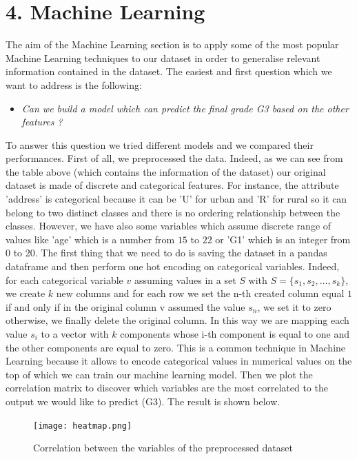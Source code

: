 \documentclass[a4paper, 11pt]{report}
\theoremstyle{definition}
\numberwithin{equation}{section}		%
\numberwithin{figure}{section}			%
\numberwithin{table}{section}				%
\begin{document}
\section*{4. Machine Learning}
The aim of the Machine Learning section is to apply some of the most popular Machine Learning techniques to our dataset in order to generalise relevant information contained in the dataset.
The easiest and first question which we want to address is the following:
\begin{itemize}
\item \textit{Can we build a model which can predict the final grade G3 based on the other features ?}
\end{itemize}
To answer this question we tried different models and we compared their performances. First of all, we preprocessed the data. Indeed, as we can see from the table above (which contains the information of the dataset) our original dataset is made of discrete and categorical features. For instance, the attribute 'address' is categorical because it can be 'U' for urban and 'R' for rural so it can belong to two distinct classes and there is no ordering relationship between the classes. However, we have also some variables which assume discrete range of values like 'age' which is a number from $15$ to $22$ or 'G1' which is an integer from $0$ to $20$. The first thing that we need to do is saving the dataset in a pandas dataframe and then perform one hot encoding on categorical variables. Indeed, for each categorical variable $v$ assuming values in a set $S$ with $S=\{s_1,s_2,\dots, s_k\}$, we create $k$ new columns and for each row we set the n-th created column equal $1$ if and only if in the original column v assumed the value $s_n$, we set it to zero otherwise, we finally delete the original column. In this way we are mapping each value $s_i$ to a vector with $k$ components whose i-th component is equal to one and the other components are equal to zero. This is a common technique in Machine Learning because it allows to encode categorical values in numerical values on the top of which we can train our machine learning model. Then we plot the correlation matrix to discover which variables are the most correlated to the output we would like to predict (G3). The result is shown below. 
\begin{figure}[h]\centering
\texttt{[image: heatmap.png]}
\caption{Correlation between the variables of the preprocessed dataset}
\end{figure}
\end{document}
